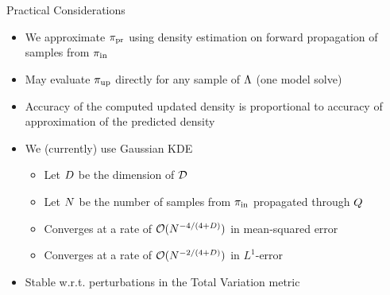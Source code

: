 \begin{frame}{Practical Considerations}

\begin{itemize}
	\item We approximate $\operatorname*{\pi_{pr}}$ using density estimation on forward propagation of samples from $\operatorname*{\pi_{in}}$
	\item May evaluate $\operatorname*{\pi_{up}}$ directly for any sample of ${\Lambda}$ (one model solve)
	\item Accuracy of the computed updated density is proportional to accuracy of approximation of the predicted density
	\item We (currently) use Gaussian KDE
	\begin{itemize}
			\item Let $D$ be the dimension of $\mathcal{D}$
			\item Let $N$ be the number of samples from $\operatorname*{\pi_{in}}$ propagated through $Q$
			\item Converges at a rate of $\mathcal{O}(N^{-4/(4+D)})$ in mean-squared error
			\item Converges at a rate of $\mathcal{O}(N^{-2/(4+D)})$ in $L^1$-error
	\end{itemize}
  \item Stable w.r.t. perturbations in the Total Variation metric
\end{itemize}
\end{frame}

